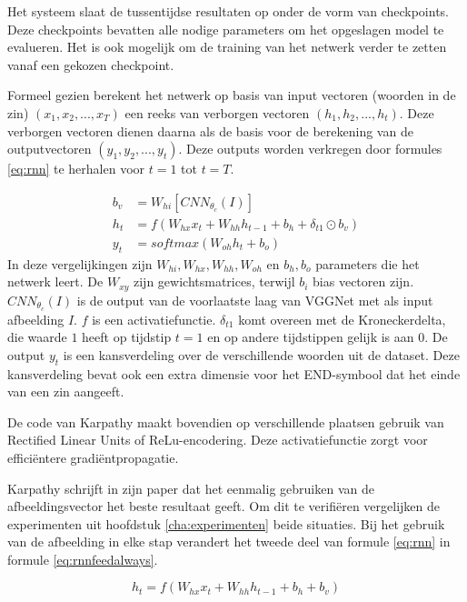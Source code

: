 Het systeem slaat de tussentijdse resultaten op onder de vorm van checkpoints. Deze checkpoints bevatten alle nodige parameters om het opgeslagen model te evalueren. Het is ook mogelijk om de training van het netwerk verder te zetten vanaf een gekozen checkpoint.

Formeel gezien berekent het netwerk op basis van input vectoren (woorden in de zin) $(x_1,x_2,...,x_T)$ een reeks van verborgen vectoren $(h_1,h_2,...,h_t)$. Deze verborgen vectoren dienen daarna als de basis voor de berekening van de outputvectoren $(y_1,y_2,...,y_t)$. Deze outputs worden verkregen door formules \eqref{eq:rnn} te herhalen voor $t = 1$ tot $t=T$.

\begin{equation}
\begin{aligned}
     b_v &= W_{hi} [CNN_{\theta_c}(I)] \\
     h_t &= f(W_{hx} x_{t} + W_{hh} h_{t-1} + b_h + \delta_{t1} \odot b_v) \\
     y_t &= softmax( W_{oh} h_t + b_o)
\end{aligned}
\label{eq:rnn}
\end{equation}
In deze vergelijkingen zijn $W_{hi}, W_{hx}, W_{hh}, W_{oh}$ en $b_h, b_o$ parameters die het netwerk leert. De $W_{xy}$ zijn gewichtsmatrices, terwijl $b_i$ bias vectoren zijn. $CNN_{\theta_c}(I)$ is de output van de voorlaatste laag van VGGNet met als input afbeelding $I$. $f$ is een activatiefunctie. $\delta_{t1}$ komt overeen met de Kroneckerdelta, die waarde $1$ heeft op tijdstip $t=1$ en op andere tijdstippen gelijk is aan $0$. De output $y_t$ is een kansverdeling over de verschillende woorden uit de dataset. Deze kansverdeling bevat ook een extra dimensie voor het END-symbool dat het einde van een zin aangeeft. 

De code van Karpathy maakt bovendien op verschillende plaatsen gebruik van Rectified Linear Units of ReLu-encodering. Deze activatiefunctie zorgt voor effici\"entere gradi\"entpropagatie.

Karpathy schrijft in zijn paper dat het eenmalig gebruiken van de afbeeldingsvector het beste resultaat geeft. Om dit te verifi\"eren vergelijken de experimenten uit hoofdstuk \ref{cha:experimenten} beide situaties. Bij het gebruik van de afbeelding in elke stap verandert het tweede deel van formule \eqref{eq:rnn} in formule \eqref{eq:rnnfeedalways}.

\begin{equation}
     h_t = f(W_{hx} x_{t} + W_{hh} h_{t-1} + b_h + b_v)
\label{eq:rnnfeedalways}
\end{equation}

